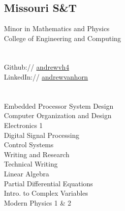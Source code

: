 \documentclass[]{deedy-resume-andrewvanhorn}
\begin{document}
%
%
\lastupdated

%
%



%
%

\begin{minipage}[t]{0.33\textwidth} 

\sectionsep
\sectionsep
\sectionsep
\sectionsep
\section{} 

\subsection{Missouri S\&T}
Minor in Mathematics and Physics \\
College of Engineering and Computing \\
\sectionsep


\section{} 
Github:// \href{https://github.com/andrewvh4}{andrewvh4} \\
LinkedIn:// \href{https://www.linkedin.com/in/andrewvanhorn/}{andrewvanhorn} \\
\sectionsep


\section{}
Embedded Processor System Design\\
Computer Organization and Design\\
Electronics 1\\
Digital Signal Processing\\
Control Systems\\
Writing and Research\\
Technical Writing\\
Linear Algebra\\
Partial Differential Equations\\
Intro. to Complex Variables\\
Modern Physics 1 \& 2


\end{minipage}
\end{document}
